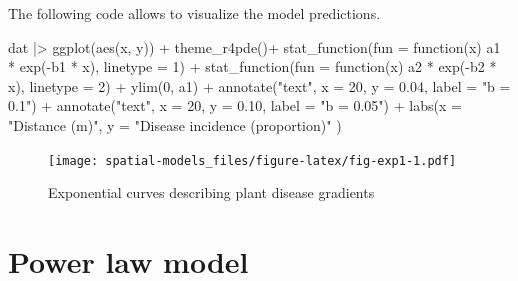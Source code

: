 \documentclass[
  letterpaper,
]{book}
\newenvironment{Shaded}{\begin{snugshade}}{\end{snugshade}}
\newcommand{\AttributeTok}[1]{\textcolor[rgb]{0.40,0.45,0.13}{#1}}
\newcommand{\ControlFlowTok}[1]{\textcolor[rgb]{0.00,0.23,0.31}{#1}}
\newcommand{\DecValTok}[1]{\textcolor[rgb]{0.68,0.00,0.00}{#1}}
\newcommand{\FloatTok}[1]{\textcolor[rgb]{0.68,0.00,0.00}{#1}}
\newcommand{\FunctionTok}[1]{\textcolor[rgb]{0.28,0.35,0.67}{#1}}
\newcommand{\NormalTok}[1]{\textcolor[rgb]{0.00,0.23,0.31}{#1}}
\newcommand{\SpecialCharTok}[1]{\textcolor[rgb]{0.37,0.37,0.37}{#1}}
\newcommand{\StringTok}[1]{\textcolor[rgb]{0.13,0.47,0.30}{#1}}
\begin{document}
The following code allows to visualize the model predictions.

\begin{Shaded}
\begin{Highlighting}[]
\NormalTok{dat }\SpecialCharTok{|\textgreater{}}
  \FunctionTok{ggplot}\NormalTok{(}\FunctionTok{aes}\NormalTok{(x, y)) }\SpecialCharTok{+}
  \FunctionTok{theme\_r4pde}\NormalTok{()}\SpecialCharTok{+}
  \FunctionTok{stat\_function}\NormalTok{(}\AttributeTok{fun =} \ControlFlowTok{function}\NormalTok{(x) a1 }\SpecialCharTok{*} \FunctionTok{exp}\NormalTok{(}\SpecialCharTok{{-}}\NormalTok{b1 }\SpecialCharTok{*}\NormalTok{ x), }\AttributeTok{linetype =} \DecValTok{1}\NormalTok{) }\SpecialCharTok{+}
  \FunctionTok{stat\_function}\NormalTok{(}\AttributeTok{fun =} \ControlFlowTok{function}\NormalTok{(x) a2 }\SpecialCharTok{*} \FunctionTok{exp}\NormalTok{(}\SpecialCharTok{{-}}\NormalTok{b2 }\SpecialCharTok{*}\NormalTok{ x), }\AttributeTok{linetype =} \DecValTok{2}\NormalTok{) }\SpecialCharTok{+}
  \FunctionTok{ylim}\NormalTok{(}\DecValTok{0}\NormalTok{, a1) }\SpecialCharTok{+}
  \FunctionTok{annotate}\NormalTok{(}\StringTok{"text"}\NormalTok{, }\AttributeTok{x =} \DecValTok{20}\NormalTok{, }\AttributeTok{y =} \FloatTok{0.04}\NormalTok{, }\AttributeTok{label =} \StringTok{"b = 0.1"}\NormalTok{) }\SpecialCharTok{+}
  \FunctionTok{annotate}\NormalTok{(}\StringTok{"text"}\NormalTok{, }\AttributeTok{x =} \DecValTok{20}\NormalTok{, }\AttributeTok{y =} \FloatTok{0.10}\NormalTok{, }\AttributeTok{label =} \StringTok{"b = 0.05"}\NormalTok{) }\SpecialCharTok{+}
  \FunctionTok{labs}\NormalTok{(}\AttributeTok{x =} \StringTok{"Distance (m)"}\NormalTok{, }\AttributeTok{y =} \StringTok{"Disease incidence (proportion)"}
\NormalTok{  )}
\end{Highlighting}
\end{Shaded}

\begin{figure}

\texttt{[image: spatial-models\_files/figure-latex/fig-exp1-1.pdf]} \hfill{}

\caption{\label{fig-exp1}Exponential curves describing plant disease
gradients}

\end{figure}

\hypertarget{power-law-model}{%
\section{Power law model}\label{power-law-model}}
\end{document}
